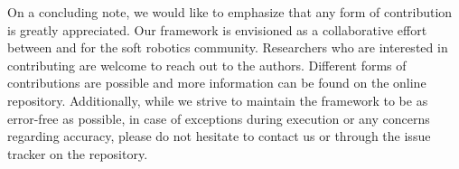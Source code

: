 On a concluding note, we would like to emphasize that any form of contribution is greatly appreciated. Our framework is envisioned as a collaborative effort between and for the soft robotics community. Researchers who are interested in contributing are welcome to reach out to the authors. Different forms of contributions are possible and more information can be found on the online repository. Additionally, while we strive to maintain the framework to be as error-free as possible, in case of exceptions during execution or any concerns regarding accuracy, please do not hesitate to contact us or through the issue tracker on the repository.


